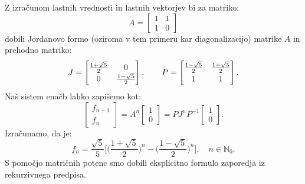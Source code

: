 \documentclass[mat1]{fmfdelo}
\begin{document}
\begin{zgled} 
    Z izračunom lastnih vrednosti in lastnih vektorjev bi za matriko:
    \begin{equation*}
        A = 
        \begin{bmatrix}
            1 & 1 \\
            1 & 0
        \end{bmatrix}
    \end{equation*}
    dobili Jordanovo formo (oziroma v tem primeru kar diagonalizacijo) matrike $A$ in prehodno matriko:
    \begin{equation*}
        J = 
        \begin{bmatrix}
                \frac{1+\sqrt{5}}{2} & 0 \\
            0 &  \frac{1-\sqrt{5}}{2}
        \end{bmatrix}
        ,\quad \quad
        P = 
        \begin{bmatrix}
            \frac{1-\sqrt{5}}{2} &  \frac{1+\sqrt{5}}{2} \vspace{2pt} \\
            1 & 1
        \end{bmatrix}.
    \end{equation*}
    Naš sistem enačb lahko zapišemo kot:
    \begin{equation*}
        \begin{bmatrix}
            f_{n+1} \\
            f_n
        \end{bmatrix}
        =
        A^n
        \begin{bmatrix}
            1 \\
            0
        \end{bmatrix}
        = PJ^n P^{-1}
        \begin{bmatrix}
            1 \\
            0
        \end{bmatrix}.
    \end{equation*}
    Izračunamo, da je:
    \begin{equation*}
        f_n = \frac{\sqrt{5}}{5}\Big[ \Big(\frac{1+\sqrt{5}}{2}\Big)^n - \Big(\frac{1-\sqrt{5}}{2}\Big)^n \Big], \quad n \in \mathbb{N}_0.
    \end{equation*}
    S pomočjo matričnih potenc smo dobili eksplicitno formulo zaporedja iz rekurzivnega predpisa.
\end{zgled}
\end{document}

